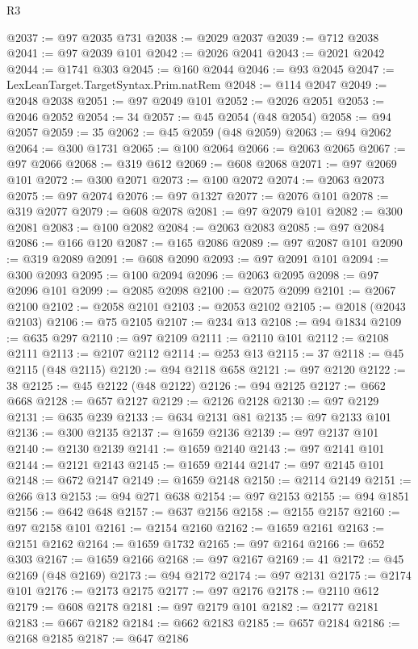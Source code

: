 \begin{lexlean}{R3}
\begin{coremodule}
@2037 := @97 @2035 @731
@2038 := @2029 @2037
@2039 := @712 @2038
@2041 := @97 @2039 @101
@2042 := @2026 @2041
@2043 := @2021 @2042
@2044 := @1741 @303
@2045 := @160 @2044
@2046 := @93 @2045
@2047 := LexLeanTarget.TargetSyntax.Prim.natRem
@2048 := @114 @2047
@2049 := @2048 @2038
@2051 := @97 @2049 @101
@2052 := @2026 @2051
@2053 := @2046 @2052
@2054 := 34
@2057 := @45 @2054 (@48 @2054)
@2058 := @94 @2057
@2059 := 35
@2062 := @45 @2059 (@48 @2059)
@2063 := @94 @2062
@2064 := @300 @1731
@2065 := @100 @2064
@2066 := @2063 @2065
@2067 := @97 @2066
@2068 := @319 @612
@2069 := @608 @2068
@2071 := @97 @2069 @101
@2072 := @300 @2071
@2073 := @100 @2072
@2074 := @2063 @2073
@2075 := @97 @2074
@2076 := @97 @1327
@2077 := @2076 @101
@2078 := @319 @2077
@2079 := @608 @2078
@2081 := @97 @2079 @101
@2082 := @300 @2081
@2083 := @100 @2082
@2084 := @2063 @2083
@2085 := @97 @2084
@2086 := @166 @120
@2087 := @165 @2086
@2089 := @97 @2087 @101
@2090 := @319 @2089
@2091 := @608 @2090
@2093 := @97 @2091 @101
@2094 := @300 @2093
@2095 := @100 @2094
@2096 := @2063 @2095
@2098 := @97 @2096 @101
@2099 := @2085 @2098
@2100 := @2075 @2099
@2101 := @2067 @2100
@2102 := @2058 @2101
@2103 := @2053 @2102
@2105 := @2018 (@2043 @2103)
@2106 := @75 @2105
@2107 := @234 @13
@2108 := @94 @1834
@2109 := @635 @297
@2110 := @97 @2109
@2111 := @2110 @101
@2112 := @2108 @2111
@2113 := @2107 @2112
@2114 := @253 @13
@2115 := 37
@2118 := @45 @2115 (@48 @2115)
@2120 := @94 @2118 @658
@2121 := @97 @2120
@2122 := 38
@2125 := @45 @2122 (@48 @2122)
@2126 := @94 @2125
@2127 := @662 @668
@2128 := @657 @2127
@2129 := @2126 @2128
@2130 := @97 @2129
@2131 := @635 @239
@2133 := @634 @2131 @81
@2135 := @97 @2133 @101
@2136 := @300 @2135
@2137 := @1659 @2136
@2139 := @97 @2137 @101
@2140 := @2130 @2139
@2141 := @1659 @2140
@2143 := @97 @2141 @101
@2144 := @2121 @2143
@2145 := @1659 @2144
@2147 := @97 @2145 @101
@2148 := @672 @2147
@2149 := @1659 @2148
@2150 := @2114 @2149
@2151 := @266 @13
@2153 := @94 @271 @638
@2154 := @97 @2153
@2155 := @94 @1851
@2156 := @642 @648
@2157 := @637 @2156
@2158 := @2155 @2157
@2160 := @97 @2158 @101
@2161 := @2154 @2160
@2162 := @1659 @2161
@2163 := @2151 @2162
@2164 := @1659 @1732
@2165 := @97 @2164
@2166 := @652 @303
@2167 := @1659 @2166
@2168 := @97 @2167
@2169 := 41
@2172 := @45 @2169 (@48 @2169)
@2173 := @94 @2172
@2174 := @97 @2131
@2175 := @2174 @101
@2176 := @2173 @2175
@2177 := @97 @2176
@2178 := @2110 @612
@2179 := @608 @2178
@2181 := @97 @2179 @101
@2182 := @2177 @2181
@2183 := @667 @2182
@2184 := @662 @2183
@2185 := @657 @2184
@2186 := @2168 @2185
@2187 := @647 @2186

\end{coremodule}
\end{lexlean}
